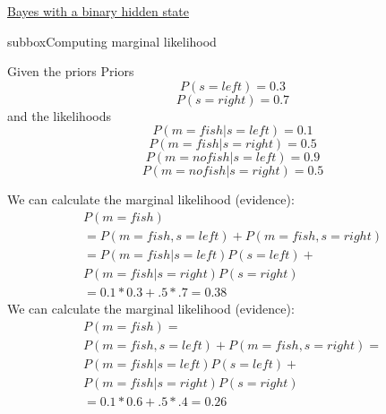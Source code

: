 \begin{textbox}{\href{https://compneuro.neuromatch.io/tutorials/W3D1_BayesianDecisions/student/W3D1_Tutorial1.html}{Bayes with a binary hidden state } }
\begin{subbox}{subbox}{Computing marginal likelihood}
\scriptsize

Given the priors
Priors
$$P(s = left) = 0.3$$
$$P(s = right) = 0.7$$
and the likelihoods
$$P(m = fish | s = left) = 0.1$$
$$P(m = fish | s = right) = 0.5$$
$$P(m = no fish | s = left) = 0.9$$
$$P(m = no fish | s = right) = 0.5$$

We can calculate the marginal likelihood (evidence):
 \begin{eqnarray*}   P(m = fish)\\ 
 = P(m = fish, s = left) + P(m = fish, s = right)\\
                = P(m = fish | s = left)P(s = left) +\\ P(m = fish | s = right)P(s = right)\\
                = 0.1 * 0.3 + .5 * .7
            = 0.38
            \end{eqnarray*}
We can calculate the marginal likelihood (evidence): 
  \begin{eqnarray*}    P(m = fish) =\\ P(m = fish, s = left) + P(m = fish, s = right)
                =\\ P(m = fish | s = left)P(s = left) + \\P(m = fish | s = right)P(s = right)\\
                = 0.1 * 0.6 + .5 * .4
                = 0.26
                 \end{eqnarray*} 
\end{subbox}

\end{textbox}
